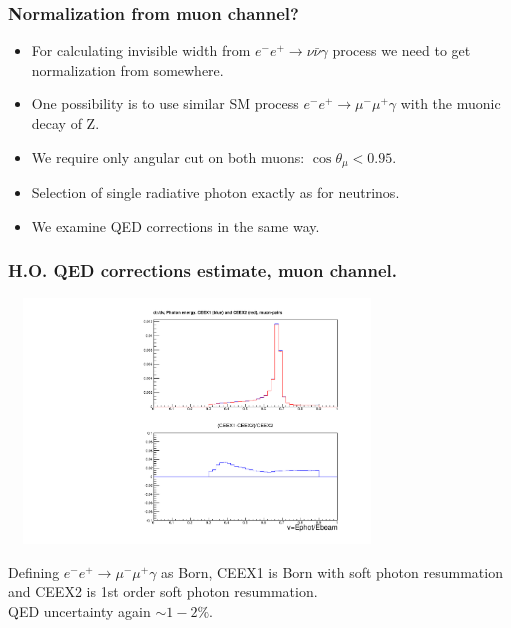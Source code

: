 \documentclass{beamer}
\newcommand{\crd}{\color{red}}
\begin{document}
\begin{frame}[fragile]
\frametitle{\bf Normalization from muon channel?}

\begin{itemize}
\item
For calculating invisible width from
$e^-e^+\to \nu \bar\nu \gamma$ process
we need to get normalization from somewhere.
\item
One possibility is to use similar SM process
$e^-e^+\to\mu^- \mu^+ \gamma$ with the muonic
decay of Z.
\item
We require only angular cut on both muons:
$\cos\theta_\mu <0.95$.
\item
Selection of single radiative photon exactly as for neutrinos.
\item
We examine QED corrections in the same way.
\end{itemize}

\end{frame}

\begin{frame}[fragile]
\frametitle{\bf H.O. QED corrections estimate, muon channel.}

\vspace{-2mm}
{\includegraphics[width=100mm,height=65mm]{mcCeex21mu.pdf}}

\small
Defining $e^-e^+\to  \mu^- \mu^+ \gamma$ as Born, 
CEEX1 is Born with soft photon resummation 
and CEEX2 is 1st order soft photon resummation.\\
{\crd QED uncertainty again $\sim 1-2\%$.}

\end{frame}
\end{document}
